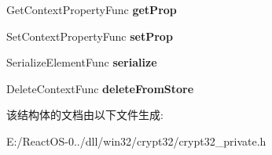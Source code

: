 \begin{DoxyCompactItemize}
Get\+Context\+Property\+Func {\bfseries get\+Prop}
\item 
\mbox{\label{struct___w_i_n_e___c_o_n_t_e_x_t___i_n_t_e_r_f_a_c_e_a0b6b5e262611cb1f33e6eb4d78bc7f23}} 
Set\+Context\+Property\+Func {\bfseries set\+Prop}
\item 
\mbox{\label{struct___w_i_n_e___c_o_n_t_e_x_t___i_n_t_e_r_f_a_c_e_a9368b90e5d38872cfbdef6aee6340d02}} 
Serialize\+Element\+Func {\bfseries serialize}
\item 
\mbox{\label{struct___w_i_n_e___c_o_n_t_e_x_t___i_n_t_e_r_f_a_c_e_a341ce88aa72a9ed19c8740eb4ad5bbd5}} 
Delete\+Context\+Func {\bfseries delete\+From\+Store}
\end{DoxyCompactItemize}


该结构体的文档由以下文件生成\+:\begin{DoxyCompactItemize}
\item 
E\+:/\+React\+O\+S-\/0../dll/win32/crypt32/crypt32\+\_\+private.\+h\end{DoxyCompactItemize}
